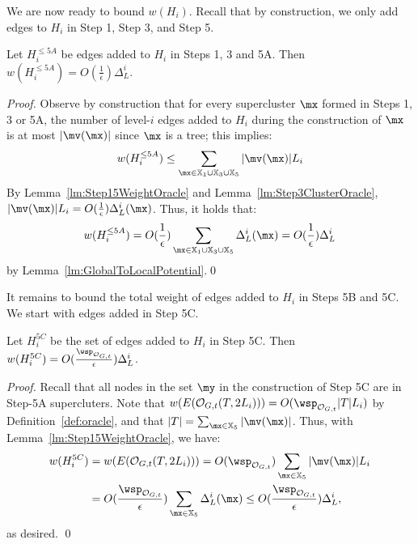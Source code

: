 We are now ready to bound $w(H_i)$. Recall that by construction, we only add edges to $H_i$ in Step 1, Step 3, and Step 5. 

\begin{lemma}\label{lm:H5A} Let $H^{\leq 5A}_i$ be edges added to $H_i$ in  Steps 1, 3 and 5A. Then $w(H^{\leq 5A}_i) = O(\frac{1}{\epsilon}) \Delta^i_{L}$.
\end{lemma}
\begin{proof}
Observe by construction that for every supercluster $\mx$ formed in Steps 1, 3 or 5A, the number of level-$i$ edges added to $H_i$ during the construction of $\mx$ is at most $|\mv(\mx)|$ since $\mx$ is a tree; this implies:
\begin{equation*}
w(H^{\leq 5A}_i)  \leq \sum_{\mx \in \mathbb{X}_1\cup \mathbb{X}_3\cup \mathbb{X}_5} |\mv(\mx)| L_i
\end{equation*}
By Lemma~\ref{lm:Step15WeightOracle} and Lemma~\ref{lm:Step3ClusterOracle}, $|\mv(\mx)| L_i = O(\frac{1}{\epsilon})\Delta^i_{L}(\mx)$. Thus, it holds that:
\begin{equation*}
w(H^{\leq 5A}_i)   = O(\frac{1}{\epsilon}) \sum_{\mx \in \mathbb{X}_1\cup \mathbb{X}_3\cup \mathbb{X}_5} \Delta^i_{L}(\mx) = O(\frac{1}{\epsilon}) \Delta^i_{L}
\end{equation*}
by Lemma~\ref{lm:GlobalToLocalPotential}.\qed
\end{proof}

It remains to bound the total weight of edges added to $H_i$ in Steps 5B and 5C. We start with edges added in Step 5C.

\begin{lemma}\label{lm:H5C}
	Let $H_i^{5C}$ be the set of edges added to $H_i$ in Step 5C. Then $w(H_i^{5C}) = O(\frac{\wsp_{\mathcal{O}_{G,t}}}{\epsilon})\Delta^i_{L}$.
\end{lemma}
\begin{proof} Recall that all nodes in the set $\my$ in the construction of Step 5C are in Step-5A supercluters. Note that  $w(E(\mathcal{O}_{G,t}(T,2L_i))) = O(\wsp_{\mathcal{O}_{G,t}} |T| L_i)$ by Definition~\ref{def:oracle}, and that $|T| = \sum_{\mx\in \mathbb{X}_5}|\mv(\mx)|$. Thus, with Lemma~\ref{lm:Step15WeightOracle}, we have:
	\begin{equation*}
	\begin{split}
		w(H_i^{5C}) &= w(E(\mathcal{O}_{G,t}(T,2L_i)))   = O(\wsp_{\mathcal{O}_{G,t}})  \sum_{\mx\in \mathbb{X}_5}|\mv(\mx)| L_i\\
		 &= O(\frac{\wsp_{\mathcal{O}_{G,t}}}{\epsilon}) \sum_{\mx\in \mathbb{X}_5} \Delta^i_{L}(\mx) \leq O(\frac{\wsp_{\mathcal{O}_{G,t}}}{\epsilon}) \Delta^i_{L},
	\end{split}
\end{equation*}
as desired. \qed	
\end{proof}


